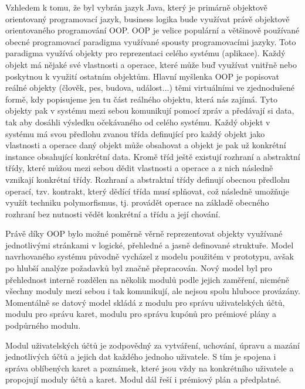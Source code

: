 		Vzhledem k tomu, že byl vybrán jazyk Java, který je primárně objektově orientovaný programovací jazyk, business
		logika bude využívat právě objektově orientovaného programování \ac{OOP}.
		\ac{OOP} je velice populární a většinově používané obecné programovací paradigma využívané spousty programovacími
		jazyky.
		Toto paradigma využívá objekty pro reprezentaci celého systému (aplikace).
		Každý objekt má nějaké své vlastnosti a operace, které může buď využívat vnitřně nebo poskytnou k využití ostatním
		objektům.
		Hlavní myšlenka \ac{OOP} je popisovat reálné objekty (člověk, pes, budova, událost...) těmi virtuálními ve zjednodušené
		formě, kdy popisujeme jen tu část reálného objektu, která nás zajímá.
		Tyto objekty pak v systému mezi sebou komunikují pomocí zpráv a předávají si data, tak aby dosáhli výsledku
		očekávaného od celého systému.
		Každý objekt v systému má svou předlohu zvanou třída definující pro každý objekt jako vlastnosti a operace daný objekt
		může obsahovat a objekt je pak už konkrétní instance obsahující konkrétní data.
		Kromě tříd ještě existují rozhraní a abstraktní třídy, které můžou mezi sebou dědit vlastnosti a operace a z nich
		následně vznikají konkrétní třídy.
		Rozhraní a abstraktní třídy definují obecnou předlohu operací, tzv. kontrakt, který dědící třída musí splňovat, což
		následně umožňuje využít techniku polymorfismus, tj. provádět operace na základě obecného rozhraní bez nutnosti
		vědět konkrétní a třídu a její chování.
		\cite{oop}

		Právě díky \ac{OOP} bylo možné poměrně věrně reprezentovat objekty využívané jednotlivými stránkami v logické,
		přehledné a jasně definované struktuře.
		Model navrhovaného systému původně vycházel z modelu použitém v prototypu, avšak po hlubší analýze požadavků byl
		značně přepracován.
		Nový model byl pro přehlednost interně rozdělen na několik modulů podle jejich zaměření, nicméně všechny moduly
		mezi sebou i tak komunikují, ale nejsou spolu hluboce provázány.
		Momentálně se datový model skládá z modulu pro správu uživatelských účtů, modulu pro správu karet, modulu pro správu
		kupónů pro prémiové plány a podpůrného modulu.

		Modul uživatelských účtů je zodpovědný za vytváření, uchování, úpravu a mazání jednotlivých účtů a jejich dat
		každého jednoho uživatele.
		S tím je spojena i správa oblíbených karet a poznámek, které jsou vždy na konkrétního uživatele a propojují
		moduly účtů a karet.
		Modul dál řeší i prémiový plán a předplatné.

